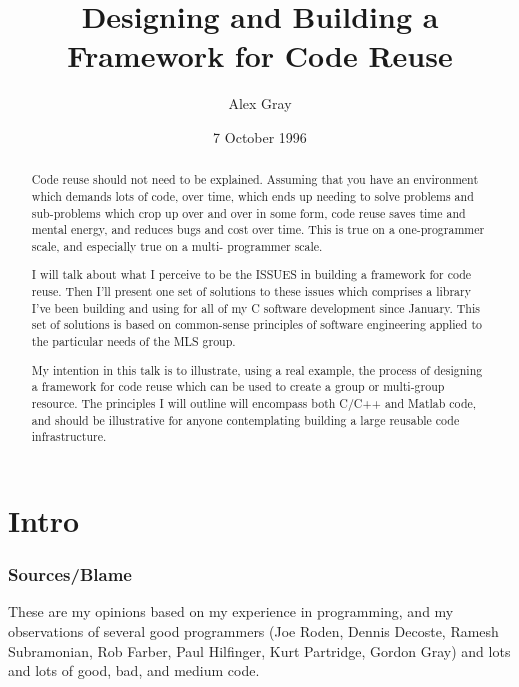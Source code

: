 




\title{Designing and Building a Framework for Code Reuse}

\author{Alex Gray}

\date{7 October 1996}

\maketitle


\begin{abstract}
	Code reuse should not need to be explained.  Assuming that you have an
environment which demands lots of code, over time, which ends up needing to 
solve problems and sub-problems which crop up over and over in some form,
code reuse saves time and mental energy, and reduces bugs and cost over time.
This is true on a one-programmer scale, and especially true on a multi-
programmer scale.

	I will talk about what I perceive to be the ISSUES in building a framework 
for code reuse.  Then I'll present one set of solutions to these issues which
comprises a library I've been building and using for all of my C software
development since January.  
This set of solutions is based on common-sense 
principles of software engineering applied to the particular needs of the MLS 
group.  

	My intention in this talk is to illustrate, using a real example, the 
process of designing a framework for code reuse which can be used to create a 
group or multi-group resource.  
The principles I will outline will encompass 
both C/C++ and Matlab code, and should be illustrative for anyone contemplating
building a large reusable code infrastructure.
\end{abstract}

\pagebreak
\part{Intro}

\section*{Sources/Blame}
These are my opinions based on my experience in programming, and my observations
	of several good programmers (Joe Roden, Dennis Decoste, Ramesh Subramonian,
	Rob Farber, Paul Hilfinger, Kurt Partridge, Gordon Gray) and lots and lots
	of good, bad, and medium code.

